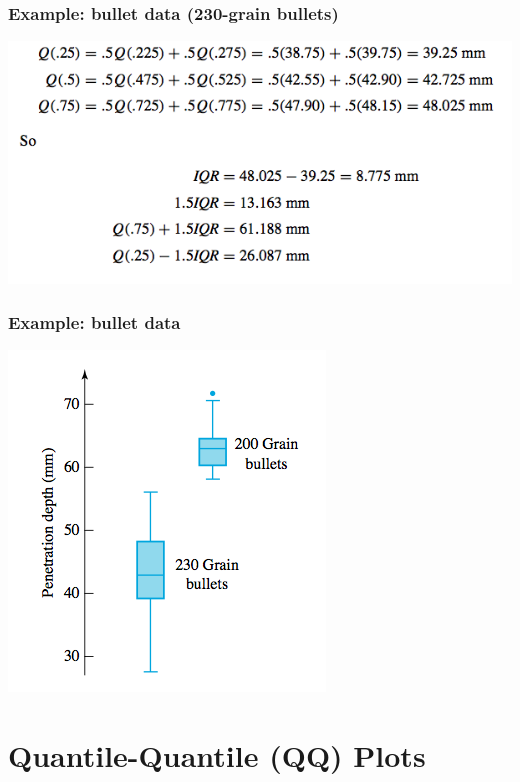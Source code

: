\documentclass{beamer}\usepackage{graphicx, color}
\numberwithin{equation}{section}
\begin{document}
\begin{frame}
\frametitle{Example: bullet data (230-grain bullets)}
\begin{center}
 \includegraphics{../../fig/bulletquartiles.png}
\end{center}
\end{frame}

\begin{frame}
\frametitle{Example: bullet data}
\begin{center}
 \includegraphics{../../fig/bulletbox.png}
\end{center}
\end{frame}


\section{Quantile-Quantile (QQ) Plots}
\end{document}

